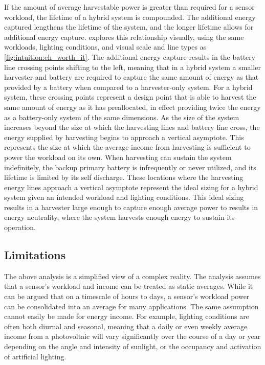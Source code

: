 If the amount of average harvestable power is greater than required for a sensor workload, the lifetime of a hybrid system is compounded.
The additional energy captured lengthens the lifetime of the system, and the longer lifetime allows for additional energy capture.
 explores this relationship visually, using the same workloads, lighting conditions, and visual scale and line types as \cref{fig:intuition:eh_worth_it}. The additional energy capture results in the battery line crossing points shifting to the left, meaning that in a hybrid system a smaller harvester and battery are required to capture the same amount of energy as that provided by a battery when compared to a harvester-only system.
For a hybrid system, these crossing points represent a design point that is able to harvest the same amount of energy as it has preallocated, in effect providing twice the energy as a battery-only system of the same dimensions.
As the size of the system increases beyond the size at which the harvesting lines and battery line cross, the energy supplied by harvesting begins to approach a vertical asymptote.
This represents the size at which the average income from harvesting is sufficient to power the workload on its own. 
When harvesting can sustain the system indefinitely, the backup primary battery is infrequently or never utilized, and its lifetime is limited by its self discharge.
These locations where the harvesting energy lines approach a vertical asymptote represent the ideal sizing for a hybrid system given an intended workload and lighting conditions.
This ideal sizing results in a harvester large enough to capture enough average power to results in energy neutrality, where the system harvests enough energy to sustain its operation.

\subsection{Limitations}

The above analysis is a simplified view of a complex reality.
The analysis assumes that a sensor's workload and income can be treated as static averages.
While it can be argued that on a timescale of hours to days, a sensor's workload power can be consolidated into an average for many applications.
The same assumption cannot easily be made for energy income.
For example, lighting conditions are often both diurnal and seasonal, meaning that a daily or even weekly average income from a photovoltaic will vary significantly over the course of a day or year depending on the angle and intensity of sunlight, or the occupancy and activation of artificial lighting.

